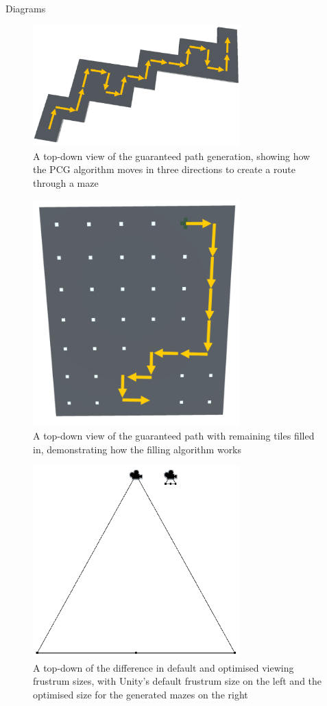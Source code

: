 \documentclass[final]{cmpreport}
\begin{document}
\begin{section}{Diagrams}

\begin{figure}[H]
    \centering
    \includegraphics[width=8cm]{img/1-maze.png}
    \caption{A top-down view of the guaranteed path generation, showing how the PCG algorithm moves in three directions to create a route through a maze}
    \label{fig:pathgen}
\end{figure}

\begin{figure}[H]
    \centering
    \includegraphics[width=8cm]{img/filled-path.png}
    \caption{A top-down view of the guaranteed path with remaining tiles filled in, demonstrating how the filling algorithm works}
    \label{fig:filledpath}
\end{figure}

\begin{figure}[H]
    \centering
    \includegraphics[width=8cm]{img/frustrums.png}
    \caption{A top-down of the difference in default and optimised viewing frustrum sizes, with Unity's default frustrum size on the left and the optimised size for the generated mazes on the right}
    \label{fig:frustrums}
\end{figure}


\end{section}
\end{document}

